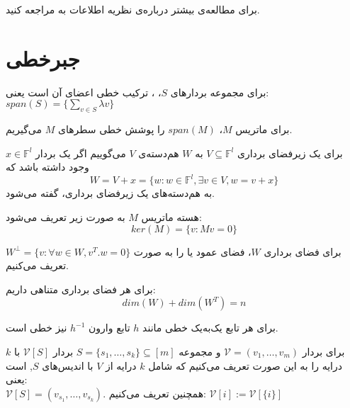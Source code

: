 	برای مطالعه‌ی بیشتر درباره‌ی نظریه اطلاعات به
\cite{book:info}
مراجعه کنید.
\section{جبرخطی}
\begin{definition}
	برای مجموعه بردار‌های
	$S$، ،
	ترکیب خطی اعضای آن است یعنی:
	$span(S) = \{ \sum\limits_{v \in S} \lambda v\}$
	
	برای ماتریس
	$M$، $span(M)$
را پوشش خطی سطرهای 
$M$
می‌گیریم.
\end{definition}

\begin{definition}[هم‌دسته]
	\label{coset}
	برای یک زیرفضای برداری
	$V \subseteq \mathbb{F}^l$
	به
	$W$
	هم‌دسته‌‌‌ی
	$V$
	می‌گوییم اگر یک بردار
	$x \in \mathbb{F}^l$
	وجود داشته باشد که
	$$W = V + x = \{w: w \in \mathbb{F}^l, \exists v \in V, w = v + x\}$$
	به هم‌دسته‌های یک زیرفضای برداری،
	گفته می‌شود.
\end{definition}
\begin{definition}
	هسته ماتریس
	$M$
	به صورت زیر تعریف می‌شود:
	$$ker(M) = \{v: Mv = 0\}$$
\end{definition}
\begin{definition}
برای فضای برداری
$W$،
فضای عمود یا 
 را به صورت
$W^\bot = \{v: \forall w \in W, v^T.w = 0\}$
تعریف می‌کنیم.
\end{definition}

\begin{theorem}
	برای هر فضای برداری متناهی داریم:
	$$dim(W) + dim(W^T) = n$$
\end{theorem}
\begin{remark}
	برای هر تابع یک‌به‌یک خطی مانند
	$h$
	تابع وارون 
	$h^{-1}$
	نیز خطی است.
\end{remark}
\begin{notation}
برای بردار
$\mathcal{V} = (v_1, \ldots, v_m)$ 
و مجموعه
$S = \{s_1, \ldots, s_k\} \subseteq [m]$
بردار
$\mathcal{V} [S]$ 
با 
$k$ درایه 
را به این صورت تعریف می‌کنیم که شامل
$k$ 
درایه از
$V$ 
با اندیس‌های
$S$, 
است یعنی:\\
$\mathcal{V} [S] = (v_{s_1}, \ldots, v_{s_k})$.
همچنین تعریف می‌کنیم:
$\mathcal{V} [i] := \mathcal{V} [{\{i\}}]$
\end{notation}


